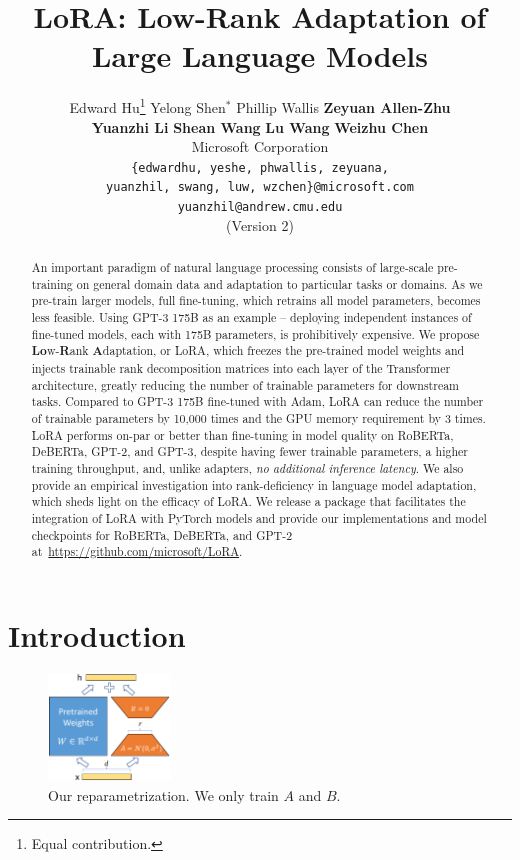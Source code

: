 \documentclass{article} %
\title{LoRA: Low-Rank Adaptation of Large Language Models}
\author{%
  Edward Hu\thanks{Equal contribution.}
  \qquad Yelong Shen$^*$
  \qquad Phillip Wallis
  \qquad \textbf{Zeyuan Allen-Zhu} \\
  \textbf{Yuanzhi Li}
  \qquad \textbf{Shean Wang}
  \qquad \textbf{Lu Wang}
  \qquad \textbf{Weizhu Chen}\\
  Microsoft Corporation \\
  \texttt{\{edwardhu, yeshe, phwallis, zeyuana,} \\
  \texttt{yuanzhil, swang, luw, wzchen\}@microsoft.com} \\
  \texttt{yuanzhil@andrew.cmu.edu} \\
  (Version 2)}
\begin{document}
\maketitle

\begin{abstract}
An important paradigm of natural language processing consists of large-scale pre-training on general domain data and adaptation to particular tasks or domains.
As we pre-train larger models, full fine-tuning, which retrains all model parameters, becomes less feasible.
Using GPT-3 175B as an example -- deploying independent instances of fine-tuned models, each with 175B parameters, is prohibitively expensive.
We propose \textbf{Lo}w-\textbf{R}ank \textbf{A}daptation, or LoRA, which freezes the pre-trained model weights and injects trainable rank decomposition matrices into each layer of the Transformer architecture, greatly reducing the number of trainable parameters for downstream tasks.
Compared to GPT-3 175B fine-tuned with Adam, LoRA can reduce the number of trainable parameters by 10,000 times and the GPU memory requirement by 3 times.
LoRA performs on-par or better than fine-tuning in model quality on RoBERTa, DeBERTa, GPT-2, and GPT-3, despite having fewer trainable parameters, a higher training throughput, and, unlike adapters, \textit{no additional inference latency}.
We also provide an empirical investigation into rank-deficiency in language model adaptation, which sheds light on the efficacy of LoRA.
We release a package that facilitates the integration of LoRA with PyTorch models and provide our implementations and model checkpoints for RoBERTa, DeBERTa, and GPT-2 at~\url{https://github.com/microsoft/LoRA}.
\end{abstract}

\section{Introduction}

\begin{figure}
  \centering
  \includegraphics[width=0.29\textwidth]{figures/figure1.pdf}
  \caption{Our reparametrization. We only train $A$ and $B$.}
  \label{fig:reparam}
\end{figure}
\end{document}
